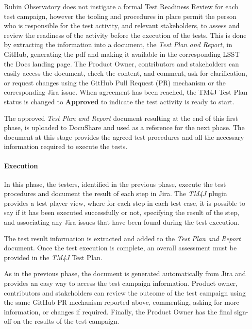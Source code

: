 Rubin Observatory does not instigate a formal Test Readiness Review for each test campaign,
however the tooling and procedures in place permit the person who is responsible for the test activity, and relevant stakeholders, 
to assess and review the readiness of the activity before the execution of the tests.
This is done by extracting the information into a document, the \textit{Test Plan and Report}, in GitHub, generating the pdf and making it available
in the corresponding LSST the Docs landing page. The Product Owner, contributors and stakeholders can easily access the document,
check the content, and comment, ask for clarification, or request changes using the GitHub
Pull Request (PR) mechanism or the corresponding Jira issue. 
When agreement has been reached, the TM4J Test Plan status is changed to \textbf{Approved} to indicate the test activity is ready to start.

The approved \textit{Test Plan and Report} document resulting at the end of this first phase, is uploaded to DocuShare 
and used as a reference for the next phase. The document at this stage provides the agreed test procedures and all the necessary 
information required to execute the tests.

\paragraph{Execution}
In this phase, the testers, identified in the previous phase, execute the test procedures and
document the result of each step in Jira.
The \textit{TM4J} plugin provides a test player view, where for each step in each test case, it is possible to say if it has been executed successfully or not,
specifying the result of the step, and associating any Jira issues that have been found during the test execution.

The test result information is extracted and added to the \textit{Test Plan and Report} document.
Once the test execution is complete, an overall assessment must be provided in the \textit{TM4J} Test Plan.

As in the previous phase, the document is generated automatically from Jira and provides an easy way to access the test campaign information.
Product owner, contributors and stakeholders can review the outcome of the test campaign 
using the same GitHub PR mechanism reported above, commenting, asking for more information, or changes if required.
Finally, the Product Owner has the final sign-off on the results of the test campaign.

